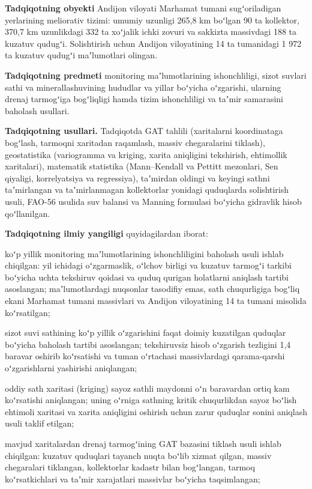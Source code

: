 \documentclass[14pt,a4paper,oneside]{extreport}
\begin{document}
\textbf{Tadqiqotning obyekti} Andijon viloyati Marhamat tumani
sugʻoriladigan yerlarining meliorativ tizimi: umumiy uzunligi 265,8 km
boʻlgan 90 ta kollektor, 370,7 km uzunlikdagi 332 ta xoʻjalik ichki
zovuri va sakkizta massivdagi 188 ta kuzatuv qudugʻi. Solishtirish uchun
Andijon viloyatining 14 ta tumanidagi 1 972 ta kuzatuv qudugʻi
maʼlumotlari olingan.

\textbf{Tadqiqotning predmeti} monitoring maʼlumotlarining
ishonchliligi, sizot suvlari sathi va minerallashuvining hududlar va
yillar boʻyicha oʻzgarishi, ularning drenaj tarmogʻiga bogʻliqligi hamda
tizim ishonchliligi va taʼmir samarasini baholash usullari.

\textbf{Tadqiqotning usullari.} Tadqiqotda GAT tahlili (xaritalarni
koordinataga bogʻlash, tarmoqni xaritadan raqamlash, massiv
chegaralarini tiklash), geostatistika (variogramma va kriging, xarita
aniqligini tekshirish, ehtimollik xaritalari), matematik statistika
(Mann--Kendall va Pettitt mezonlari, Sen qiyaligi, korrelyatsiya va
regressiya), taʼmirdan oldingi va keyingi sathni taʼmirlangan va
taʼmirlanmagan kollektorlar yonidagi quduqlarda solishtirish usuli,
FAO-56 usulida suv balansi va Manning formulasi boʻyicha gidravlik hisob
qoʻllanilgan.

\textbf{Tadqiqotning ilmiy yangiligi} quyidagilardan iborat:

koʻp yillik monitoring maʼlumotlarining ishonchliligini baholash usuli
ishlab chiqilgan: yil ichidagi oʻzgarmaslik, oʻlchov birligi va kuzatuv
tarmogʻi tarkibi boʻyicha uchta tekshiruv qoidasi va quduq qurigan
holatlarni aniqlash tartibi asoslangan; maʼlumotlardagi nuqsonlar
tasodifiy emas, sath chuqurligiga bogʻliq ekani Marhamat tumani
massivlari va Andijon viloyatining 14 ta tumani misolida koʻrsatilgan;

sizot suvi sathining koʻp yillik oʻzgarishini faqat doimiy kuzatilgan
quduqlar boʻyicha baholash tartibi asoslangan; tekshiruvsiz hisob
oʻzgarish tezligini 1,4 baravar oshirib koʻrsatishi va tuman oʻrtachasi
massivlardagi qarama-qarshi oʻzgarishlarni yashirishi aniqlangan;

oddiy sath xaritasi (kriging) sayoz sathli maydonni oʻn baravardan ortiq
kam koʻrsatishi aniqlangan; uning oʻrniga sathning kritik chuqurlikdan
sayoz boʻlish ehtimoli xaritasi va xarita aniqligini oshirish uchun
zarur quduqlar sonini aniqlash usuli taklif etilgan;

mavjud xaritalardan drenaj tarmogʻining GAT bazasini tiklash usuli
ishlab chiqilgan: kuzatuv quduqlari tayanch nuqta boʻlib xizmat qilgan,
massiv chegaralari tiklangan, kollektorlar kadastr bilan bogʻlangan,
tarmoq koʻrsatkichlari va taʼmir xarajatlari massivlar boʻyicha
taqsimlangan;
\end{document}
